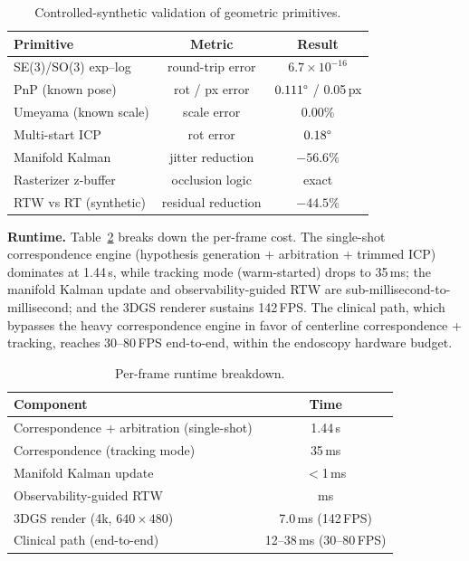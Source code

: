\documentclass[9pt,twoside,web]{ieeecolor2}
\begin{document}
\begin{table}[t]
\centering
\caption{Controlled-synthetic validation of geometric primitives.}
\label{tab:unit}
\setlength{\tabcolsep}{4pt}\small
\begin{tabular}{lcc}
\toprule
Primitive & Metric & Result \\
\midrule
SE(3)/SO(3) exp--log & round-trip error & $6.7\times10^{-16}$ \\
PnP (known pose) & rot / px error & $0.111\degree$ / 0.05\,px \\
Umeyama (known scale) & scale error & 0.00\% \\
Multi-start ICP & rot error & $0.18\degree$ \\
Manifold Kalman & jitter reduction & $-56.6\%$ \\
Rasterizer z-buffer & occlusion logic & exact \\
RTW vs RT (synthetic) & residual reduction & $-44.5\%$ \\
\bottomrule
\end{tabular}
\end{table}

\textbf{Runtime.} Table~\ref{tab:runtime} breaks down the per-frame cost. The single-shot correspondence engine (hypothesis generation + arbitration + trimmed ICP) dominates at 1.44\,s, while tracking mode (warm-started) drops to 35\,ms; the manifold Kalman update and observability-guided RTW are sub-millisecond-to-millisecond; and the 3DGS renderer sustains 142\,FPS. The clinical path, which bypasses the heavy correspondence engine in favor of centerline correspondence + tracking, reaches 30--80\,FPS end-to-end, within the endoscopy hardware budget.

\begin{table}[t]
\centering
\caption{Per-frame runtime breakdown.}
\label{tab:runtime}
\begin{tabular}{lc}
\toprule
Component & Time \\
\midrule
Correspondence + arbitration (single-shot) & 1.44\,s \\
Correspondence (tracking mode) & 35\,ms \\
Manifold Kalman update & $<$1\,ms \\
Observability-guided RTW & ms \\
3DGS render (4k, $640\times480$) & 7.0\,ms (142\,FPS) \\
Clinical path (end-to-end) & 12--38\,ms (30--80\,FPS) \\
\bottomrule
\end{tabular}
\end{table}
\end{document}
